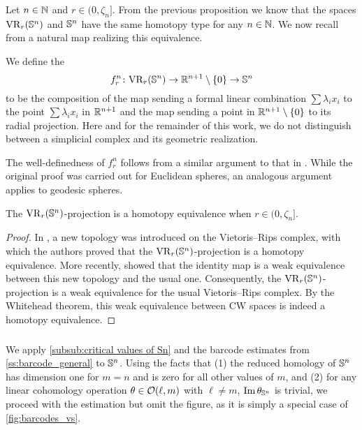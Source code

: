 \subsubsection{}\label{ss:VRSn projection}

Let \(n \in \mathbb{N}\) and \(r \in (0, \zeta_n]\).
From the previous proposition we know that the spaces \(\mathrm{VR}_r(\mathbb{S}^n)\) and \(\mathbb{S}^n\) have the same homotopy type for any \(n \in \mathbb{N}\).
We now recall from \cite{adamaszek2020homotopy} a natural map realizing this equivalence.

We define the 
\[
f_r^n \colon \mathrm{VR}_r(\mathbb{S}^n) \to \mathbb{R}^{n+1} \setminus \{0\} \to \mathbb{S}^n
\]
to be the composition of the map sending a formal linear combination $\sum\lambda_i x_i$ to the point \(\sum\lambda_i x_i\) in \(\mathbb{R}^{n+1}\) and the map sending a point in \(\mathbb{R}^{n+1} \setminus \{0\}\) to its radial projection.
Here and for the remainder of this work, we do not distinguish between a simplicial complex and its geometric realization.

The well-definedness of $f_r^n$ follows from a similar argument to that in \cite[Lemma 3]{lovasz1983self}.
While the original proof was carried out for Euclidean spheres, an analogous argument applies to geodesic spheres.

\medskip\proposition
The \(\mathrm{VR}_r(\mathbb{S}^n)\)-projection is a homotopy equivalence when $r \in (0, \zeta_n]$.

\begin{proof}
    In \cite{adamaszek2018metric}, a new topology was introduced on the Vietoris--Rips complex, with which the authors proved that the $\mathrm{VR}_r(\mathbb{S}^n)$-projection is a homotopy equivalence.
    More recently, \cite{gillespie2024vietoris} showed that the identity map is a weak equivalence between this new topology and the usual one.
    Consequently, the $\mathrm{VR}_r(\mathbb{S}^n)$-projection is a weak equivalence for the usual Vietoris--Rips complex.
    By the Whitehead theorem, this weak equivalence between CW spaces is indeed a homotopy equivalence.
\end{proof}

\subsubsection{}

\label{subsub:barcode_Sn}

We apply \cref{subsub:critical values of Sn} and the barcode estimates from \cref{ss:barcode_general} to \(\mathbb{S}^n\).
Using the facts that (1) the reduced homology of \(\mathbb{S}^n\) has dimension one for \(m = n\) and is zero for all other values of \(m\), and (2) for any linear cohomology operation \(\theta \in \mathcal{O}(\ell, m)\) with \(\ell \neq m\), \(\operatorname{Im} \theta_{\mathbb{S}^n}\) is trivial, we proceed with the estimation but omit the figure, as it is simply a special case of \cref{fig:barcodes_vs}.

